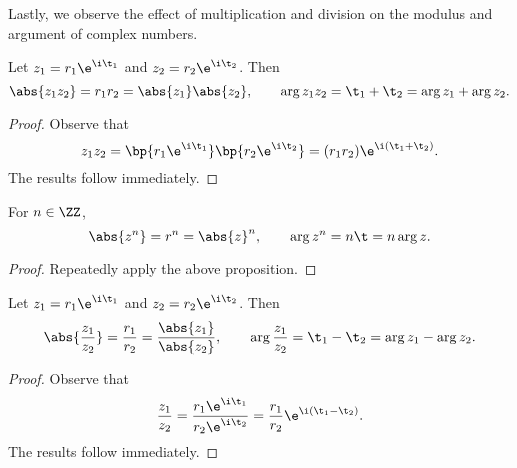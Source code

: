 Lastly, we observe the effect of multiplication and division on the modulus and argument of complex numbers.

\begin{proposition}
    Let $z_1 = r_1 \e^{\i \t_1}$ and $z_2 = r_2 \e^{\i \t_2}$. Then \[\abs{z_1 z_2} = r_1 r_2 = \abs{z_1} \abs{z_2}, \qquad \arg{z_1 z_2} = \t_1 + \t_2 = \arg{z_1} + \arg{z_2}.\]
\end{proposition}
\begin{proof}
    Observe that \[z_1 z_2 = \bp{r_1 \e^{\i \t_1}}\bp{r_2 \e^{\i \t_2}} = (r_1 r_2) \e^{\i (\t_1 + \t_2)}.\] The results follow immediately.
\end{proof}

\begin{corollary}
    For $n \in \ZZ$, \[\abs{z^n} = r^n = \abs{z}^n, \qquad \arg{z^n} = n \t = n \arg{z}.\]
\end{corollary}
\begin{proof}
    Repeatedly apply the above proposition.
\end{proof}

\begin{proposition}
    Let $z_1 = r_1 \e^{\i \t_1}$ and $z_2 = r_2 \e^{\i \t_2}$. Then \[\abs{\frac{z_1}{z_2}} = \frac{r_1}{r_2} = \frac{\abs{z_1}}{\abs{z_2}}, \qquad \arg{\frac{z_1}{z_2}} = \t_1 - \t_2 = \arg{z_1} - \arg{z_2}.\]
\end{proposition}
\begin{proof}
    Observe that \[\frac{z_1}{z_2} = \frac{r_1 \e^{\i \t_1}}{r_2 \e^{\i \t_2}} = \frac{r_1}{r_2} \e^{\i (\t_1 - \t_2)}.\] The results follow immediately.
\end{proof}